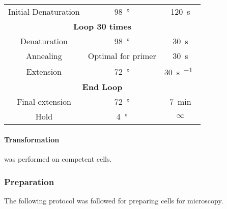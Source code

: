 \documentclass[../main.tex]{subfiles}
\begin{document}
\begin{center}
\begin{tabular}{ccc}
Initial Denaturation	& \SI{98}{\degree} & \SI{120}{\second}\\
\multicolumn{3}{c}{\textbf{Loop 30 times}}\\
Denaturation		&	\SI{98}{\degree}		&	\SI{30}{\second}\\
Annealing 		&	Optimal for primer	&	\SI{30}{\second}\\
Extension		&	\SI{72}{\degree}		&	\SI{30}{\second\per\kilo\base}\\
\multicolumn{3}{c}{\textbf{End Loop}}\\
Final extension	&	\SI{72}{\degree}		&	\SI{7}{\minute}\\
Hold				&	\SI{4}{\degree}		&	\(\infty\)
\end{tabular}
\end{center}

\paragraph{Transformation} was performed on  competent cells.

\subsubsection{Preparation}

The following protocol was followed for preparing cells for microscopy.
\end{document}
